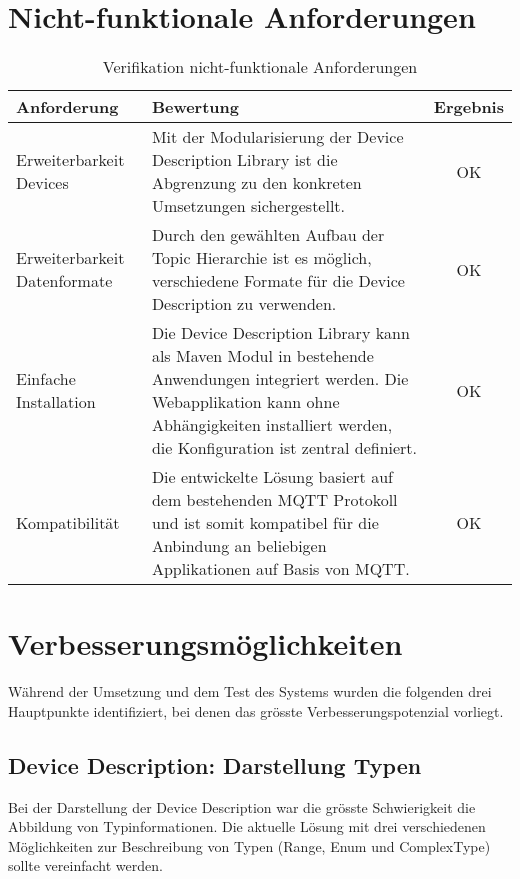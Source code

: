\section{Nicht-funktionale Anforderungen}

\begin{table}[H]
\begin{tabularx}{\textwidth}{|l|X|c|}

 \hline \rowcolor{lightgray}
 {\bf Anforderung } & {\bf Bewertung } & {\bf Ergebnis} \\  \hline
 
 Erweiterbarkeit Devices & Mit der Modularisierung der Device Description Library ist die Abgrenzung zu den konkreten Umsetzungen sichergestellt. & OK \\ \hline

 Erweiterbarkeit Datenformate   & Durch den gewählten Aufbau der Topic Hierarchie ist es möglich, verschiedene Formate für die Device Description zu verwenden. & OK \\ \hline

 Einfache Installation    & Die Device Description Library kann als Maven Modul in bestehende Anwendungen integriert werden. Die Webapplikation kann ohne Abhängigkeiten installiert werden, die Konfiguration ist zentral definiert. & OK \\ \hline

 Kompatibilität     & Die entwickelte Lösung basiert auf dem bestehenden MQTT Protokoll und ist somit kompatibel für die Anbindung an beliebigen Applikationen auf Basis von MQTT. & OK \\ \hline


\end{tabularx}
\caption{Verifikation nicht-funktionale Anforderungen}
\end{table}




\section{Verbesserungsmöglichkeiten}

Während der Umsetzung und dem Test des Systems wurden die folgenden drei Hauptpunkte identifiziert, bei denen das grösste Verbesserungspotenzial vorliegt.

\subsection{Device Description: Darstellung Typen}
Bei der Darstellung der Device Description war die grösste Schwierigkeit die Abbildung von Typinformationen. Die aktuelle Lösung mit drei verschiedenen Möglichkeiten zur Beschreibung von Typen (Range, Enum und ComplexType) sollte vereinfacht werden.

